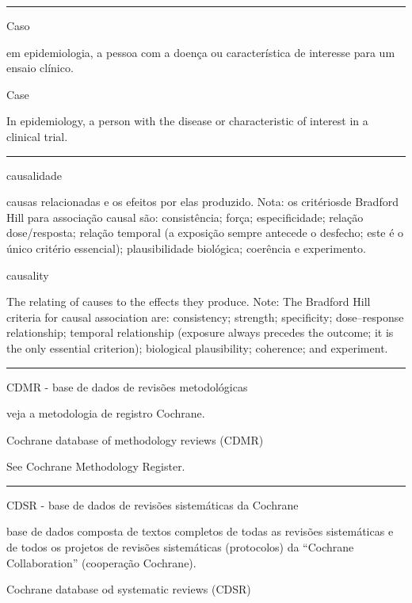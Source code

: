 \documentclass[
]{book}
\begin{document}
\begin{center}\rule{0.5\linewidth}{0.5pt}\end{center}

Caso

em epidemiologia, a pessoa com a doença ou característica de interesse para um ensaio clínico.

Case

In epidemiology, a person with the disease or characteristic of interest in a clinical trial.

\begin{center}\rule{0.5\linewidth}{0.5pt}\end{center}

causalidade

causas relacionadas e os efeitos por elas produzido. Nota: os critériosde Bradford Hill para associação causal são: consistência; força; especificidade; relação dose/resposta; relação temporal (a exposição sempre antecede o desfecho; este é o único critério essencial); plausibilidade biológica; coerência e experimento.

causality

The relating of causes to the effects they produce. Note: The Bradford Hill criteria for causal association are: consistency; strength; specificity; dose--response relationship; temporal relationship (exposure always precedes the outcome; it is the only essential criterion); biological plausibility; coherence; and experiment.

\begin{center}\rule{0.5\linewidth}{0.5pt}\end{center}

CDMR - base de dados de revisões metodológicas

veja a metodologia de registro Cochrane.

Cochrane database of methodology reviews (CDMR)

See Cochrane Methodology Register.

\begin{center}\rule{0.5\linewidth}{0.5pt}\end{center}

CDSR - base de dados de revisões sistemáticas da Cochrane

base de dados composta de textos completos de todas as revisões sistemáticas e de todos os projetos de revisões sistemáticas (protocolos) da ``Cochrane Collaboration'' (cooperação Cochrane).

Cochrane database od systematic reviews (CDSR)
\end{document}
